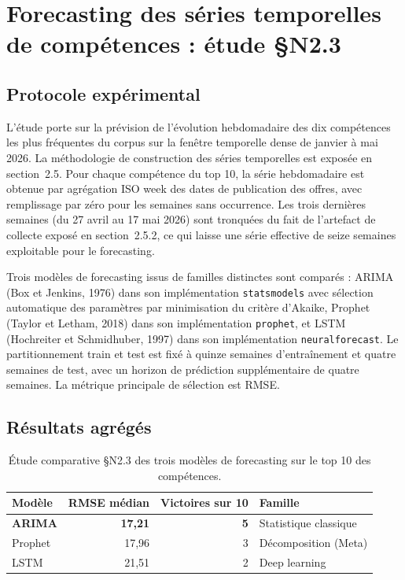 \documentclass[11pt,a4paper,openany]{report}
\begin{document}
\section{Forecasting des s\'eries temporelles de comp\'etences : \'etude \S N2.3}

\subsection{Protocole exp\'erimental}

L'\'etude porte sur la pr\'evision de l'\'evolution hebdomadaire des dix comp\'etences les plus fr\'equentes du corpus sur la fen\^etre temporelle dense de janvier \`a mai 2026. La m\'ethodologie de construction des s\'eries temporelles est expos\'ee en section~2.5. Pour chaque comp\'etence du top 10, la s\'erie hebdomadaire est obtenue par agr\'egation ISO week des dates de publication des offres, avec remplissage par z\'ero pour les semaines sans occurrence. Les trois derni\`eres semaines (du 27 avril au 17 mai 2026) sont tronqu\'ees du fait de l'artefact de collecte expos\'e en section~2.5.2, ce qui laisse une s\'erie effective de seize semaines exploitable pour le forecasting.

Trois mod\`eles de forecasting issus de familles distinctes sont compar\'es : ARIMA (Box et Jenkins, 1976) dans son impl\'ementation \texttt{statsmodels} avec s\'election automatique des param\`etres par minimisation du crit\`ere d'Akaike, Prophet (Taylor et Letham, 2018) dans son impl\'ementation \texttt{prophet}, et LSTM (Hochreiter et Schmidhuber, 1997) dans son impl\'ementation \texttt{neuralforecast}. Le partitionnement train et test est fix\'e \`a quinze semaines d'entra\^inement et quatre semaines de test, avec un horizon de pr\'ediction suppl\'ementaire de quatre semaines. La m\'etrique principale de s\'election est RMSE.

\subsection{R\'esultats agr\'eg\'es}

\begin{table}[H]
  \centering
  \caption{\'Etude comparative \S N2.3 des trois mod\`eles de forecasting sur le top 10 des comp\'etences.}
  \label{tab:forecast-agg}
  \begin{tabular}{lrrl}
    \toprule
    \rowcolor{softblue}\textbf{Mod\`ele} & \textbf{RMSE m\'edian} & \textbf{Victoires sur 10} & \textbf{Famille} \\
    \midrule
    \textbf{ARIMA} & \textbf{17,21} & \textbf{5} & Statistique classique \\
    Prophet & 17,96 & 3 & D\'ecomposition (Meta) \\
    LSTM & 21,51 & 2 & Deep learning \\
    \bottomrule
  \end{tabular}
\end{table}
\end{document}

